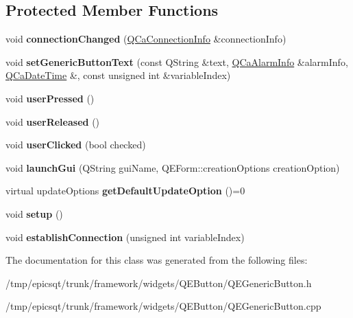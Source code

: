 \subsection*{Protected Member Functions}
\begin{DoxyCompactItemize}
\item 
\hypertarget{classQEGenericButton_a099d7ea25cb5b113bc28dba6a597f3eb}{
void {\bfseries connectionChanged} (\hyperlink{classQCaConnectionInfo}{QCaConnectionInfo} \&connectionInfo)}
\label{classQEGenericButton_a099d7ea25cb5b113bc28dba6a597f3eb}

\item 
\hypertarget{classQEGenericButton_a32fbf44e1c7a4cbf94851d511e69549f}{
void {\bfseries setGenericButtonText} (const QString \&text, \hyperlink{classQCaAlarmInfo}{QCaAlarmInfo} \&alarmInfo, \hyperlink{classQCaDateTime}{QCaDateTime} \&, const unsigned int \&variableIndex)}
\label{classQEGenericButton_a32fbf44e1c7a4cbf94851d511e69549f}

\item 
\hypertarget{classQEGenericButton_a8c47d9e60710a04e089560a4204358e4}{
void {\bfseries userPressed} ()}
\label{classQEGenericButton_a8c47d9e60710a04e089560a4204358e4}

\item 
\hypertarget{classQEGenericButton_ade9aee71af98bc722b3203759190af34}{
void {\bfseries userReleased} ()}
\label{classQEGenericButton_ade9aee71af98bc722b3203759190af34}

\item 
\hypertarget{classQEGenericButton_aa5e7d2135b2b2dd3de1649d88a170f4c}{
void {\bfseries userClicked} (bool checked)}
\label{classQEGenericButton_aa5e7d2135b2b2dd3de1649d88a170f4c}

\item 
\hypertarget{classQEGenericButton_a4d2e4da742fbf8e1bf4fcf8ee17969ee}{
void {\bfseries launchGui} (QString guiName, QEForm::creationOptions creationOption)}
\label{classQEGenericButton_a4d2e4da742fbf8e1bf4fcf8ee17969ee}

\item 
\hypertarget{classQEGenericButton_ab185c3376360c8335282e97d071490b3}{
virtual updateOptions {\bfseries getDefaultUpdateOption} ()=0}
\label{classQEGenericButton_ab185c3376360c8335282e97d071490b3}

\item 
\hypertarget{classQEGenericButton_a1265293fe6fe00c0d35f0c692d32e548}{
void {\bfseries setup} ()}
\label{classQEGenericButton_a1265293fe6fe00c0d35f0c692d32e548}

\item 
\hypertarget{classQEGenericButton_a968735c14e189b839b50704f1b28bc14}{
void {\bfseries establishConnection} (unsigned int variableIndex)}
\label{classQEGenericButton_a968735c14e189b839b50704f1b28bc14}

\end{DoxyCompactItemize}


The documentation for this class was generated from the following files:\begin{DoxyCompactItemize}
\item 
/tmp/epicsqt/trunk/framework/widgets/QEButton/QEGenericButton.h\item 
/tmp/epicsqt/trunk/framework/widgets/QEButton/QEGenericButton.cpp\end{DoxyCompactItemize}
